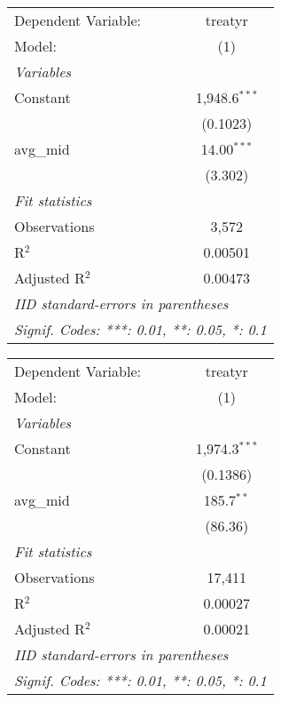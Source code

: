 \begingroup
\centering
\begin{tabular}{lc}
   \tabularnewline \midrule \midrule
   Dependent Variable: & treatyr\\  
   Model:              & (1)\\  
   \midrule
   \emph{Variables}\\
   Constant            & 1,948.6$^{***}$\\   
                       & (0.1023)\\   
   avg\_mid            & 14.00$^{***}$\\   
                       & (3.302)\\   
   \midrule
   \emph{Fit statistics}\\
   Observations        & 3,572\\  
   R$^2$               & 0.00501\\  
   Adjusted R$^2$      & 0.00473\\  
   \midrule \midrule
   \multicolumn{2}{l}{\emph{IID standard-errors in parentheses}}\\
   \multicolumn{2}{l}{\emph{Signif. Codes: ***: 0.01, **: 0.05, *: 0.1}}\\
\end{tabular}
\par\endgroup



\begingroup
\centering
\begin{tabular}{lc}
   \tabularnewline \midrule \midrule
   Dependent Variable: & treatyr\\  
   Model:              & (1)\\  
   \midrule
   \emph{Variables}\\
   Constant            & 1,974.3$^{***}$\\   
                       & (0.1386)\\   
   avg\_mid            & 185.7$^{**}$\\   
                       & (86.36)\\   
   \midrule
   \emph{Fit statistics}\\
   Observations        & 17,411\\  
   R$^2$               & 0.00027\\  
   Adjusted R$^2$      & 0.00021\\  
   \midrule \midrule
   \multicolumn{2}{l}{\emph{IID standard-errors in parentheses}}\\
   \multicolumn{2}{l}{\emph{Signif. Codes: ***: 0.01, **: 0.05, *: 0.1}}\\
\end{tabular}
\par\endgroup



